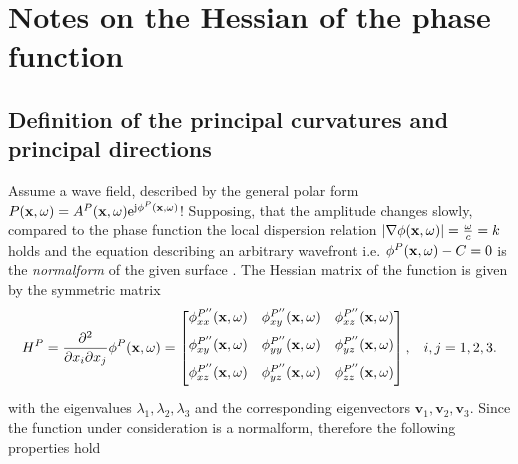 \section{Notes on the Hessian of the phase function}
\label{App:Hessian}

\subsection{Definition of the principal curvatures and principal directions}
Assume a wave field, described by the general polar form $P(\mathbf{x},\omega) = A^P(\mathbf{x},\omega)\mathrm{e}^{\mathrm{j} \phi^P (\mathbf{x},\omega)}$!
Supposing, that the amplitude changes slowly, compared to the phase function the local dispersion relation $| \nabla \phi(\mathbf{x},\omega) |= \frac{\omega}{c} = k$ holds and the equation describing an arbitrary wavefront i.e. $\phi^P(\mathbf{x},\omega) - C = 0$ is the \emph{normalform} of the given surface \cite{Hartmann1999, Hartmann2001}.
The Hessian matrix of the function is given by the symmetric matrix 
\begin{equation}
H^P =
\frac{\partial^2}{\partial x_i \partial x_j} \phi^P(\mathbf{x},\omega) 
=
 \begin{bmatrix} 
\phi^{P''}_{xx}(\mathbf{x},\omega) & \phi^{P''}_{xy}(\mathbf{x},\omega) & \phi^{P''}_{xz}(\mathbf{x},\omega) \\[.7em]
\phi^{P''}_{xy}(\mathbf{x},\omega) & \phi^{P''}_{yy}(\mathbf{x},\omega) & \phi^{P''}_{yz}(\mathbf{x},\omega) \\[.7em]
\phi^{P''}_{xz}(\mathbf{x},\omega) & \phi^{P''}_{yz}(\mathbf{x},\omega) & \phi^{P''}_{zz}(\mathbf{x},\omega) \\[0.5em]    \end{bmatrix}, \hspace{3mm} i,j = 1,2,3.
\end{equation}
with the eigenvalues $\lambda_1, \lambda_2, \lambda_3$ and the corresponding eigenvectors $\mathbf{v}_1, \mathbf{v}_2, \mathbf{v}_3$.
Since the function under consideration is a normalform, therefore the following properties hold
